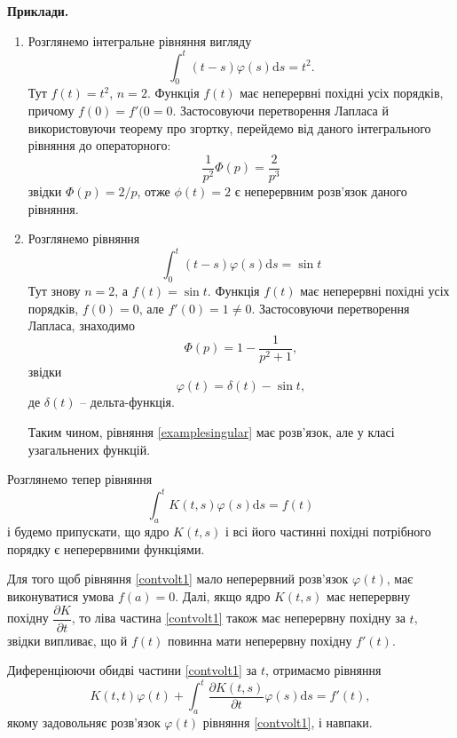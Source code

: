 \documentclass[14pt,twoside]{extreport}
\theoremstyle{mystyle}
\numberwithin{equation}{chapter}
\begin{document}
\begin{small}
	\textbf{Приклади.}
	\begin{enumerate}
		\item Розглянемо інтегральне рівняння вигляду
		\[
		\int_{0}^{t} (t-s) \varphi(s) \mathrm{d}s = t^2.
		\]
		Тут $f(t) = t^2$, $n = 2$. Функція $f(t)$ має неперервні похідні усіх порядків, причому $f(0) = f'(0 =0$. Застосовуючи перетворення Лапласа й використовуючи теорему про згортку, перейдемо від даного інтегрального рівняння до операторного:
		\[
		\frac{1}{p^2} \Phi(p)=\frac{2}{p^3}
		\]
		звідки $\Phi(p)= 2/p$, отже $\phi(t) = 2$ є неперервним розв'язок даного рівняння.
		\item Розглянемо рівняння
		\begin{equation}\label{examplesingular}
		\int_{0}^{t} (t-s) \varphi(s) \mathrm{d}s = \sin t
		\end{equation}
		Тут знову $n = 2$, а $f(t) = \sin t$. Функція $f(t)$ має неперервні похідні усіх порядків, $f(0) = 0$, але $f'(0) = 1 \neq 0$. Застосовуючи перетворення Лапласа, знаходимо
		\[
		\Phi(p)=1-\frac{1}{p^2 + 1},
		\]
		звідки
		\[
		\varphi(t) = \delta(t) - \sin t,
		\]
		де $\delta(t)$ -- дельта-функція.
		
		Таким чином, рівняння \eqref{examplesingular} має розв'язок, але у класі узагальнених функцій.
	\end{enumerate}
\end{small}

Розглянемо тепер рівняння
\begin{equation}\label{contvolt1}
\int_{a}^{t} K(t, s) \varphi(s) \mathrm{d}s = f(t)
\end{equation}
і будемо припускати, що ядро $K(t, s)$ і всі його частинні похідні потрібного порядку є неперервними функціями.

Для того щоб рівняння \eqref{contvolt1} мало неперервний розв'язок $\varphi(t)$, має виконуватися умова $f(a) = 0$. Далі, якщо ядро $K(t, s)$ має неперервну похідну $\dfrac{\partial K}{\partial t}$, то ліва частина \eqref{contvolt1} також має неперервну похідну за $t$, звідки випливає, що й $f(t)$ повинна мати неперервну похідну $f'(t)$.

Диференціюючи обидві частини \eqref{contvolt1} за $t$, отримаємо рівняння
\begin{equation}\label{diffvolt1}
K(t,t) \varphi(t) + \int_{a}^{t} \frac{\partial K(t,s)}{\partial t} \varphi(s) \mathrm{d}s = f'(t),
\end{equation}
якому задовольняє розв'язок $\varphi(t)$ рівняння \eqref{contvolt1}, і навпаки.
\end{document}
